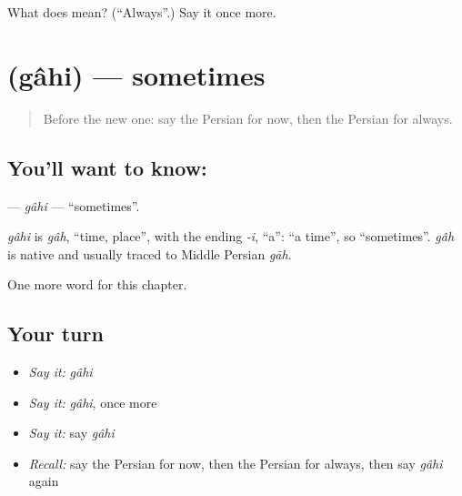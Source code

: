 \begin{tcolorbox}[breakable,colback=teal!4,colframe=teal!35!black,title={Before you move on}]
What does  mean? (\textquotedblleft{}Always\textquotedblright{}.) Say it once more.
\end{tcolorbox}
\section[\texorpdfstring{\fa{گاهی} (gâhi)}{گاهی (gâhi)}]{ (gâhi) — sometimes}

\label{lesson:FA-C66-gahi}



\begin{quote}
Before the new one: say the Persian for now, then the Persian for always.
\end{quote}

\subsection*{You'll want to know: }
\textbf{} — \emph{gâhi} — \textquotedblleft{}sometimes\textquotedblright{}.

\begin{cousinweb}
\emph{gâhi} is \emph{gâh}, \textquotedblleft{}time, place\textquotedblright{}, with the ending \emph{-i}, \textquotedblleft{}a\textquotedblright{}: \textquotedblleft{}a time\textquotedblright{}, so \textquotedblleft{}sometimes\textquotedblright{}. \emph{gâh} is native and usually traced to Middle Persian \emph{gāh}.
\end{cousinweb}

\begin{grammarlens}[title={What you've built}]
One more word for this chapter.
\end{grammarlens}

\subsection*{Your turn}
\begin{itemize}
\raggedright
  \item \emph{Say it:} \emph{gâhi}
  \item \emph{Say it:} \emph{gâhi}, once more
  \item \emph{Say it:} say \emph{gâhi}
  \item \emph{Recall:} say the Persian for now, then the Persian for always, then say \emph{gâhi} again
\end{itemize}

